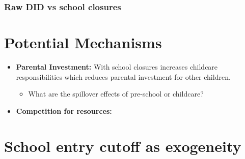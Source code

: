 \documentclass{beamer}
\begin{document}
\begin{frame}
    \label{update_scott}
    \frametitle{Raw DID vs school closures}
        {
    }
\end{frame}



\section{Potential Mechanisms}
\begin{frame}
    \label{update_scott}
\begin{itemize}
    \item \textbf{Parental Investment:} With school closures increases childcare responsibilities which reduces parental investment for other children.
    \begin{itemize}
        \item What are the spillover effects of pre-school or childcare?
    \end{itemize}
    \item \textbf{Competition for resources:}  
\end{itemize}
\end{frame}


\section{School entry cutoff as exogeneity}
\end{document}
